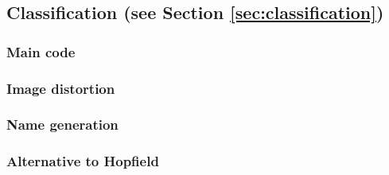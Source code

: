 \documentclass[pdftex,11pt,a4paper]{article}
\begin{document}
\subsection{Classification (see Section \ref{sec:classification})}
\subsubsection{Main code}

\subsubsection{Image distortion}

\subsubsection{Name generation}


\subsubsection{Alternative to Hopfield}

\end{document}
